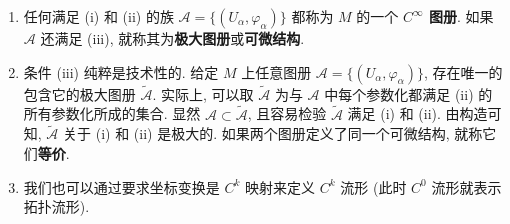 \begin{RiemannRemark}\label{rem:maximal-and-equivalent-atlases}
\begin{enumerate}[label=(\arabic*),leftmargin=*]
\item 任何满足 (i) 和 (ii) 的族 $\mathcal{A}=\{(U_\alpha,\varphi_\alpha)\}$ 都称为 $M$ 的一个 \textbf{$C^\infty$ 图册}. 如果 $\mathcal{A}$ 还满足 (iii), 就称其为\textbf{极大图册}或\textbf{可微结构}.
\item 条件 (iii) 纯粹是技术性的. 给定 $M$ 上任意图册 $\mathcal{A}=\{(U_\alpha,\varphi_\alpha)\}$, 存在唯一的包含它的极大图册 $\widetilde{\mathcal{A}}$. 实际上, 可以取 $\widetilde{\mathcal{A}}$ 为与 $\mathcal{A}$ 中每个参数化都满足 (ii) 的所有参数化所成的集合. 显然 $\mathcal{A}\subset\widetilde{\mathcal{A}}$, 且容易检验 $\widetilde{\mathcal{A}}$ 满足 (i) 和 (ii). 由构造可知, $\widetilde{\mathcal{A}}$ 关于 (i) 和 (ii) 是极大的. 如果两个图册定义了\label{idx:equivalent-atlases}同一个可微结构, 就称它们\textbf{等价}.
\item 我们也可以通过要求坐标变换是 $C^k$ 映射来定义 $C^k$ 流形 (此时 $C^0$ 流形就表示拓扑流形).
\end{enumerate}
\end{RiemannRemark}

